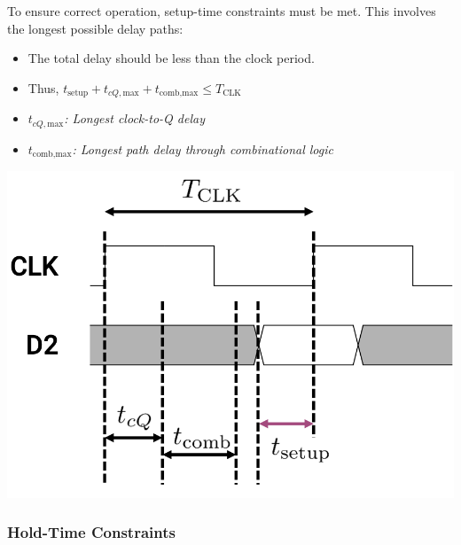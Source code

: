 \documentclass[12pt,openany]{book}
\begin{document}
\begin{center}
    \begin{minipage}{0.5\textwidth}
        To ensure correct operation, setup-time constraints must be met. This involves the longest possible delay paths:
        \begin{itemize}
            \item[] The total delay should be less than the clock period.
            \item[] Thus, \( t_{\text{setup}} + t_{cQ,\text{max}} + t_{\text{comb,max}} \leq T_{\text{CLK}} \)
            \item[] \( t_{cQ,\text{max}} \)\textit{: Longest clock-to-Q delay}
            \item[] \( t_{\text{comb,max}} \)\textit{: Longest path delay through combinational logic}
        \end{itemize}
    \end{minipage}
    \hfill
    \begin{minipage}{0.4\textwidth}
        \includegraphics[width=1\textwidth]{circuits/15.1.2_2.png}
    \end{minipage}
\end{center}

\subsubsection{Hold-Time Constraints}
\end{document}
